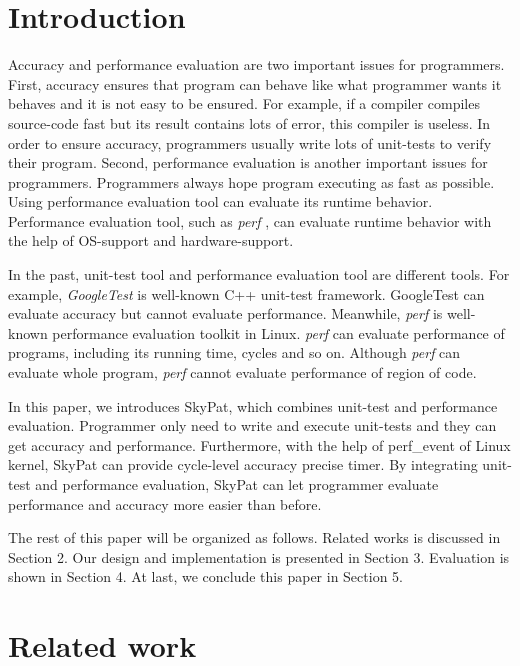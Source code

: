 \documentclass[final]{ols}
\begin{document}
\section{Introduction}
Accuracy and performance evaluation are two important issues for programmers.
First, accuracy ensures that program can behave like what programmer wants it behaves and it is not easy to be ensured. 
For example, if a compiler compiles source-code fast but its result contains lots of error, this compiler is useless.
In order to ensure accuracy, programmers usually write lots of unit-tests to verify their program.
Second, performance evaluation is another important issues for programmers.
Programmers always hope program executing as fast as possible.
Using performance evaluation tool can evaluate its runtime behavior. 
Performance evaluation tool, such as \textit{perf} \cite{perf-tools}, can evaluate runtime behavior with the help of OS-support and hardware-support.

In the past, unit-test tool and performance evaluation tool are different tools. 
For example, \textit{GoogleTest} \cite{Google-test} is well-known C++ unit-test framework.
GoogleTest can evaluate accuracy but cannot evaluate performance. 
Meanwhile, \textit{perf} is well-known performance evaluation toolkit in Linux. 
\textit{perf} can evaluate performance of programs, including its running time, cycles and so on.
Although \textit{perf} can evaluate whole program, \textit{perf} cannot evaluate performance of region of code.

In this paper, we introduces SkyPat, which combines unit-test and performance evaluation.
Programmer only need to write and execute unit-tests and they can get accuracy and performance.
Furthermore, with the help of perf\_event of Linux kernel, SkyPat can provide cycle-level accuracy precise timer.
By integrating unit-test and performance evaluation, SkyPat can let programmer evaluate performance and accuracy more easier than before.

The rest of this paper will be organized as follows. 
Related works is discussed in Section 2. 
Our design and implementation is presented in Section 3.
Evaluation is shown in Section 4.
At last, we conclude this paper in Section 5.

\section{Related work}
\end{document}
